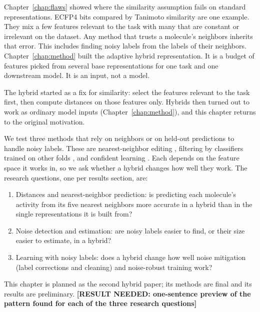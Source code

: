 Chapter~\ref{chap:flaws} showed where the similarity assumption fails on standard representations. ECFP4 bits compared by Tanimoto similarity are one example. They mix a few features relevant to the task with many that are constant or irrelevant on the dataset. Any method that trusts a molecule's neighbors inherits that error. This includes finding noisy labels from the labels of their neighbors. Chapter~\ref{chap:method} built the adaptive hybrid representation. It is a budget of features picked from several base representations for one task and one downstream model. It is an input, not a model.

The hybrid started as a fix for similarity: select the features relevant to the task first, then compute distances on those features only. Hybrids then turned out to work as ordinary model inputs (Chapter~\ref{chap:method}), and this chapter returns to the original motivation.

We test three methods that rely on neighbors or on held-out predictions to handle noisy labels. These are nearest-neighbor editing \citep{Wilson1972}, filtering by classifiers trained on other folds \citep{Brodley1999}, and confident learning \citep{Northcutt2021}. Each depends on the feature space it works in, so we ask whether a hybrid changes how well they work. The research questions, one per results section, are:
\begin{enumerate}
    \item Distances and nearest-neighbor prediction: is predicting each molecule's activity from its five nearest neighbors more accurate in a hybrid than in the single representations it is built from?
    \item Noise detection and estimation: are noisy labels easier to find, or their size easier to estimate, in a hybrid?
    \item Learning with noisy labels: does a hybrid change how well noise mitigation (label corrections and cleaning) and noise-robust training work?
\end{enumerate}

This chapter is planned as the second hybrid paper; its methods are final and its results are preliminary. \textbf{[RESULT NEEDED: one-sentence preview of the pattern found for each of the three research questions]}



